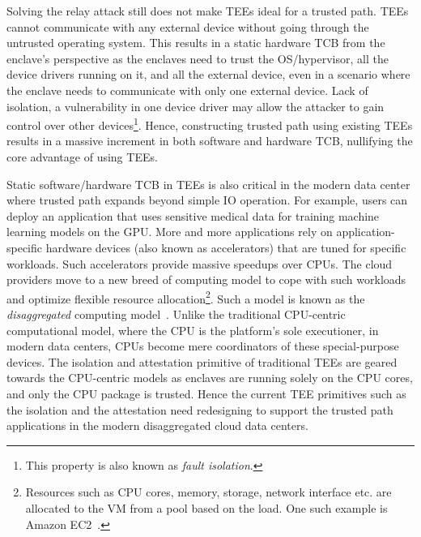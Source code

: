 Solving the relay attack still does not make TEEs ideal for a trusted path. TEEs cannot communicate with any external device without going through the untrusted operating system. This results in a static hardware TCB from the enclave's perspective as the enclaves need to trust the OS/hypervisor, all the device drivers running on it, and all the external device, even in a scenario where the enclave needs to communicate with only one external device. Lack of isolation, a vulnerability in one device driver may allow the attacker to gain control over other devices\footnote{This property is also known as \emph{fault isolation}.}. Hence, constructing trusted path using existing TEEs results in a massive increment in both software and hardware TCB, nullifying the core advantage of using TEEs.


 Static software/hardware TCB in TEEs is also critical in the modern data center where trusted path expands beyond simple IO operation. For example, users can deploy an application that uses sensitive medical data for training machine learning models on the GPU. More and more applications rely on application-specific hardware devices (also known as accelerators) that are tuned for specific workloads. Such accelerators provide massive speedups over CPUs. The cloud providers move to a new breed of computing model to cope with such workloads and optimize flexible resource allocation\footnote{Resources such as CPU cores, memory, storage, network interface etc. are allocated to the VM from a pool based on the load. One such example is Amazon EC2~\cite{ec2}.}. Such a model is known as the \emph{disaggregated} computing model~\cite{disaggregatedcomp}. Unlike the traditional CPU-centric computational model, where the CPU is the platform's sole executioner, in modern data centers, CPUs become mere coordinators of these special-purpose devices. The isolation and attestation primitive of traditional TEEs are geared towards the CPU-centric models as enclaves are running solely on the CPU cores, and only the CPU package is trusted. Hence the current TEE primitives such as the isolation and the attestation need redesigning to support the trusted path applications in the modern disaggregated cloud data centers.